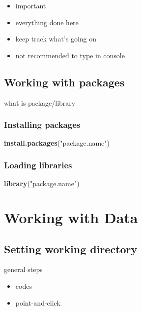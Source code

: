 \documentclass[]{book}
\newenvironment{Shaded}{\begin{snugshade}}{\end{snugshade}}
\newcommand{\KeywordTok}[1]{\textcolor[rgb]{0.13,0.29,0.53}{\textbf{{#1}}}}
\newcommand{\StringTok}[1]{\textcolor[rgb]{0.31,0.60,0.02}{{#1}}}
\newcommand{\NormalTok}[1]{{#1}}
\providecommand{\tightlist}{%
  \setlength{\itemsep}{0pt}\setlength{\parskip}{0pt}}
\theoremstyle{definition}
\theoremstyle{definition}
\theoremstyle{remark}
\begin{document}
\begin{itemize}
\tightlist
\item
  important
\item
  everything done here
\item
  keep track what's going on
\item
  not recommended to type in console
\end{itemize}

\subsection{Working with packages}\label{working-with-packages}

what is package/library

\subsubsection{Installing packages}\label{installing-packages}

\begin{Shaded}
\begin{Highlighting}[]
\KeywordTok{install.packages}\NormalTok{(}\StringTok{"package.name"}\NormalTok{)}
\end{Highlighting}
\end{Shaded}

\subsubsection{Loading libraries}\label{loading-libraries}

\begin{Shaded}
\begin{Highlighting}[]
\KeywordTok{library}\NormalTok{(}\StringTok{"package.name"}\NormalTok{)}
\end{Highlighting}
\end{Shaded}

\section{Working with Data}\label{working-with-data}

\subsection{Setting working directory}\label{setting-working-directory}

general steps

\begin{itemize}
\tightlist
\item
  codes
\item
  point-and-click 
\end{itemize}
\end{document}
